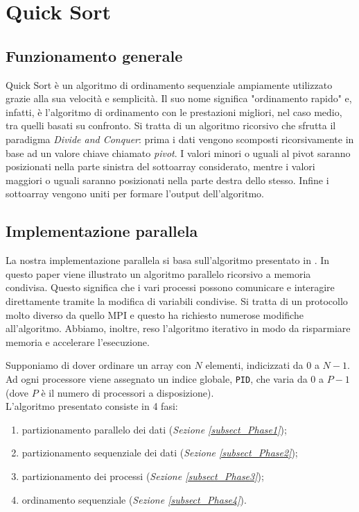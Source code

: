 \chapter{Quick Sort} \label{chap.QuickSort}
\section{Funzionamento generale}
Quick Sort è un algoritmo di ordinamento sequenziale ampiamente utilizzato grazie alla sua velocità e semplicità. Il suo nome significa "ordinamento rapido" e, infatti, è l'algoritmo di ordinamento con le prestazioni migliori, nel caso medio, tra quelli basati su confronto.
Si tratta di un algoritmo ricorsivo che sfrutta il paradigma \textit{Divide and Conquer}: prima i dati vengono scomposti ricorsivamente in base ad un valore chiave chiamato \textit{pivot}. I valori minori o uguali al pivot saranno posizionati nella parte sinistra del sottoarray considerato, mentre i valori maggiori o uguali saranno posizionati nella parte destra dello stesso. Infine i sottoarray vengono uniti per formare l'output dell'algoritmo. \\

\section{Implementazione parallela}
La nostra implementazione parallela si basa sull'algoritmo presentato in \cite{PaperQuickSort}. In questo paper viene illustrato un algoritmo parallelo ricorsivo a memoria condivisa. Questo significa che i vari processi possono comunicare e interagire direttamente tramite la modifica di variabili condivise. Si tratta di un protocollo molto diverso da quello MPI e questo ha richiesto numerose modifiche all'algoritmo. Abbiamo, inoltre, reso l'algoritmo iterativo in modo da risparmiare memoria e accelerare l'esecuzione.

Supponiamo di dover ordinare un array con $N$ elementi, indicizzati da $0$ a $N-1$. Ad ogni processore viene assegnato un indice globale, \texttt{PID}, che varia da $0$ a $P-1$ (dove $P$ è il numero di processori a disposizione).\\
L'algoritmo presentato consiste in 4 fasi:
\begin{enumerate}
\item partizionamento parallelo dei dati (\textit{Sezione \ref{subsect_Phase1}});
\item partizionamento sequenziale dei dati (\textit{Sezione \ref{subsect_Phase2}});
\item partizionamento dei processi (\textit{Sezione \ref{subsect_Phase3}});
\item ordinamento sequenziale (\textit{Sezione \ref{subsect_Phase4}}).
\end{enumerate}
 
